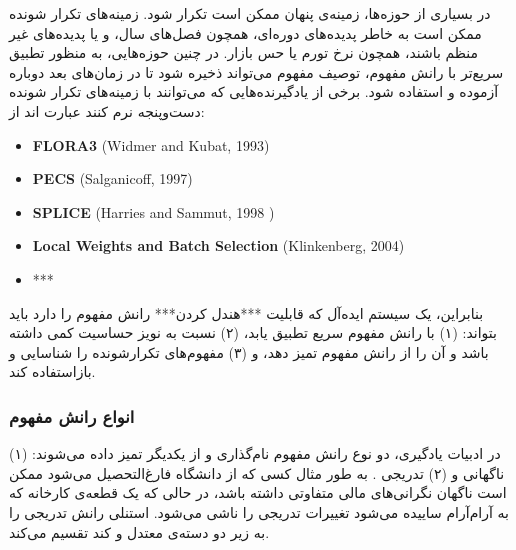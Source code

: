
در بسیاری از حوزه‌ها، زمینه‌ی پنهان ممکن است تکرار شود. زمینه‌های تکرار شونده
ممکن است به خاطر پدیده‌های دوره‌ای، همچون فصل‌های سال، و یا پدیده‌های غیر منظم باشند، همچون نرخ تورم یا حس بازار. در چنین حوزه‌هایی، به منظور تطبیق سریع‌تر با رانش مفهوم، توصیف مفهوم
می‌تواند ذخیره شود تا در زمان‌های بعد دوباره آزموده و استفاده شود. برخی از یادگیرنده‌هایی که می‌توانند با زمینه‌های تکرار شونده دست‌وپنجه نرم کنند عبارت اند از:
\begin{latin}
\begin{itemize}
\item \textbf{
FLORA3
} (Widmer and Kubat, 1993)\cite{widmerkubat1993}
\item \textbf{
PECS
} (Salganicoff, 1997)\cite{salganicoff1997}
\item \textbf{
SPLICE
} (Harries and Sammut, 1998 )\cite{harriessammut1998}
\item \textbf{
Local Weights and Batch Selection
} (Klinkenberg, 2004)\cite{klinkenberg2004}
\item ***
\end{itemize}
\end{latin}


بنابراین، یک سیستم ایده‌آل که قابلیت ***هندل کردن*** رانش مفهوم را دارد باید بتواند: (۱) با رانش مفهوم سریع تطبیق یابد، (۲) نسبت به نویز حساسیت کمی داشته باشد و آن را از رانش مفهوم تمیز دهد، و (۳) مفهوم‌های تکرارشونده را شناسایی و بازاستفاده کند.

\subsubsection{
انواع رانش مفهوم
}
در ادبیات یادگیری، دو نوع رانش مفهوم نام‌گذاری و از یکدیگر تمیز داده می‌شوند: (۱) ناگهانی
و (۲) تدریجی
. 
به طور مثال کسی که از دانشگاه فارغ‌التحصیل می‌شود ممکن است ناگهان نگرانی‌های مالی متفاوتی داشته باشد، در حالی که یک قطعه‌ی کارخانه که به آرام‌آرام ساییده می‌شود تغییرات تدریجی را ناشی می‌شود. استنلی
\cite{stanley2003}
رانش تدریجی را به زیر دو دسته‌ی معتدل
و کند
تقسیم می‌کند.


